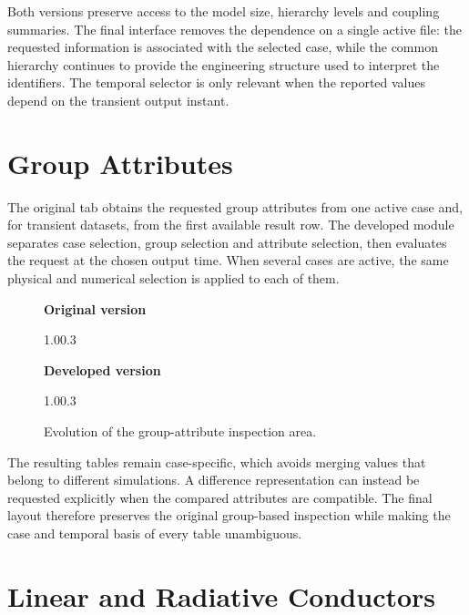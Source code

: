 Both versions preserve access to the model size, hierarchy levels and coupling
summaries. The final interface removes the dependence on a single active file:
the requested information is associated with the selected case, while the
common hierarchy continues to provide the engineering structure used to
interpret the identifiers. The temporal selector is only relevant when the
reported values depend on the transient output instant.

\section{Group Attributes}
\label{appsec:group_attributes_evolution}

The original tab obtains the requested group attributes from one active case
and, for transient datasets, from the first available result row. The developed
module separates case selection, group selection and attribute selection, then
evaluates the request at the chosen output time. When several cases are active,
the same physical and numerical selection is applied to each of them.

\begin{figure}[H]
    \centering
    \textbf{Original version}\par\vspace{0.5em}
        {1.0\textwidth}{0.3\textheight}

    \vspace{1em}
    \textbf{Developed version}\par\vspace{0.5em}
        {1.0\textwidth}{0.3\textheight}

    \caption{Evolution of the group-attribute inspection area.}
    \label{fig:appendix_group_attributes_evolution}
\end{figure}

The resulting tables remain case-specific, which avoids merging values that
belong to different simulations. A difference representation can instead be
requested explicitly when the compared attributes are compatible. The final
layout therefore preserves the original group-based inspection while making
the case and temporal basis of every table unambiguous.

\section{Linear and Radiative Conductors}
\label{appsec:conductor_modules_evolution}

